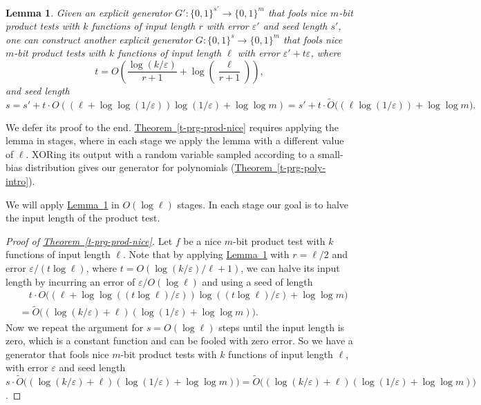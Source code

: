 \documentclass[11pt]{article}
\numberwithin{equation}{section}
\newtheorem{lemma}[theorem]{Lemma}
\theoremstyle{definition}
\theoremstyle{plain}
\newcommand{\expref}[2]{\hyperref[#2]{#1~\ref{#2}}}
\newcommand{\zo}{\{0,1\}}
\def\eps{\varepsilon}
\def\Blocklength{\ell}
\begin{document}
  \begin{lemma} \label{lemma-input-length-reduction}
    Given an explicit generator $G'\colon \zo^{s'} \to \zo^m$ that fools nice 
    $m$-bit %
    product tests with $k$ functions of input length $r$ with error $\eps'$ and seed length $s'$, one can construct another explicit generator $G\colon \zo^s \to \zo^m$ that fools nice 
    $m$-bit %
    product tests with $k$ functions of input length $\Blocklength$ with error $\eps' + t \eps$, where
    \[
      t = O \left( \frac{\log(k/\eps)}{r+1} + \log\left(\frac{\Blocklength}{r+1}\right) \right),
    \]
    and seed length
    \[
      s = s' + t \cdot O ((\Blocklength + \log\log(1/\eps)) \log(1/\eps) + \log\log m) = s' + t \cdot \tilde O\bigl( (\Blocklength \log(1/\eps)) + \log\log m \bigr).
      \]
  \end{lemma}
	We defer its proof to the end.
	\expref{Theorem}{t-prg-prod-nice} requires applying the lemma in stages, where in each stage we apply the lemma with a different value of $\Blocklength$.
	XORing its output with a random variable sampled according to a small-bias distribution gives our generator for polynomials (\expref{Theorem}{t-prg-poly-intro}).
  
	We will apply \expref{Lemma}{lemma-input-length-reduction} in $O(\log \Blocklength)$ stages.
	In each stage our goal is to halve the input length of the product test.
	
  \begin{proof}[Proof of {\expref{Theorem}{t-prg-prod-nice}}]
    Let $f$ be a nice 
    $m$-bit %
    product test with $k$ functions of input length $\Blocklength$.
Note that by applying \expref{Lemma}{lemma-input-length-reduction} with $r =
\Blocklength/2$ and error $\eps / (t \log \Blocklength)$, where $t = O(\log(k/\eps)/\Blocklength + 1)$, we can halve its
input length by incurring an error of $\eps / O(\log \Blocklength)$ and using a seed of
length
    \begin{align*}
      &\quad t \cdot O \bigl( (\Blocklength + \log\log((t \log \Blocklength)/\eps)) \log ((t \log \Blocklength) / \eps) + \log\log m \bigr) \\
      &= \tilde O \bigl( (\log(k/\eps) + \Blocklength) (\log(1/\eps) + \log\log m) \bigr).
    \end{align*}
    Now we repeat the argument for $s = O(\log \Blocklength)$ steps until the input length is zero, which is a constant function and can be fooled with zero error.
    So we have a generator that fools nice 
    $m$-bit %
    product tests with $k$ functions of input length $\Blocklength$, with error $\eps$ and seed length $s \cdot \tilde O \bigl( (\log(k/\eps) + \Blocklength) (\log(1/\eps) + \log\log m) \bigr) = \tilde O \bigl( (\log(k/\eps) + \Blocklength) (\log(1/\eps) + \log\log m) \bigr)$.
  \end{proof}
\end{document}
